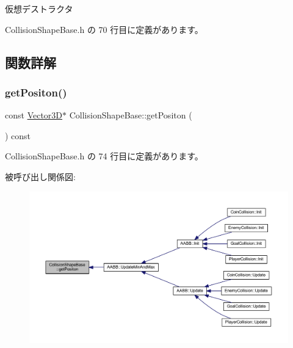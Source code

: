 仮想デストラクタ 



 Collision\+Shape\+Base.\+h の 70 行目に定義があります。



\subsection{関数詳解}
\mbox{\label{class_collision_shape_base_a17bd2d81ebf464459dd977152e02055b}} 
\subsubsection{\texorpdfstring{get\+Positon()}{getPositon()}}
{\footnotesize\ttfamily const \mbox{\hyperlink{class_vector3_d}{Vector3D}}$\ast$ Collision\+Shape\+Base\+::get\+Positon (\begin{DoxyParamCaption}{ }\end{DoxyParamCaption}) const\hspace{0.3cm}{\ttfamily [inline]}}



 Collision\+Shape\+Base.\+h の 74 行目に定義があります。

被呼び出し関係図\+:\nopagebreak
\begin{figure}[H]
\begin{center}
\leavevmode
\includegraphics[width=350pt]{class_collision_shape_base_a17bd2d81ebf464459dd977152e02055b_icgraph}
\end{center}
\end{figure}
\mbox{\label{class_collision_shape_base_a662af47ebcd9f29d7c54047a0227b8bc}} 
